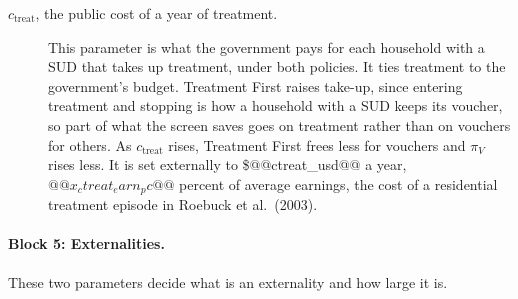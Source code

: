 \documentclass[10pt]{article}
\begin{document}
\begin{description}
\item[$c_{\text{treat}}$, the public cost of a year of treatment.] This parameter is what the government pays for each household with a SUD that takes up treatment, under both policies. It ties treatment to the government's budget. Treatment First raises take-up, since entering treatment and stopping is how a household with a SUD keeps its voucher, so part of what the screen saves goes on treatment rather than on vouchers for others. As $c_{\text{treat}}$ rises, Treatment First frees less for vouchers and $\pi_V$ rises less. It is set externally to \$@@ctreat_usd@@ a year, $@@x_ctreat_earn_pc@@$ percent of average earnings, the cost of a residential treatment episode in Roebuck et al.\ (2003).
\end{description}

\paragraph{Block 5: Externalities.} These two parameters decide what is an externality and how large it is.
\end{document}
